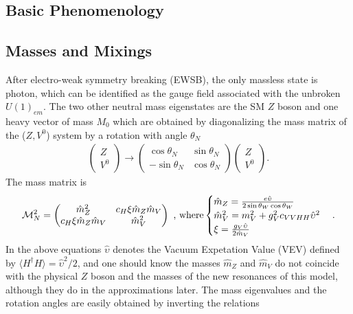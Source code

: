 \subsection{Basic Phenomenology}
\subsection*{Masses and Mixings}
After electro-weak symmetry breaking (EWSB), the only massless state is photon, which can be identified as the gauge field associated with the unbroken $U(1)_{em}$. The two other neutral mass eigenstates are the SM $Z$ boson and one heavy vector of mass $M_{0}$ which are obtained by diagonalizing the mass matrix of the ($Z,V^{0}$) system by a rotation with angle $\theta_{N}$
\begin{align}
  \begin{pmatrix}
    Z\\
    V^{0}
  \end{pmatrix}
  \rightarrow
  \begin{pmatrix}
    \cos{\theta_{N}} & \sin{\theta_{N}}\\
    -\sin{\theta_{N}}& \cos{\theta_{N}}
  \end{pmatrix}
  \begin{pmatrix}
    Z\\
    V^{0}
  \end{pmatrix}
  .
\end{align}
The mass matrix is
\begin{align}
  \label{eq:MassMatrixN}
  \mathcal{M}_{N}^{2}=
  \begin{pmatrix}
    \hat{m}_{Z}^{2} & c_{H}\xi \hat{m}_{Z} \hat{m}_{V}\\
    c_{H}\xi \hat{m}_{Z} \hat{m}_{V} & \hat{m}_{V}^{2}
  \end{pmatrix}
  \textup{ , where}
  \begin{cases}
    \hat{m}_{Z}=\frac{e\hat{\upsilon}}{2\sin{\theta_{W}}\cos{\theta_{W}}}\\
    \hat{m}_{V}^{2}=m_{V}^{2}+g_{V}^{2}c_{VVHH}\hat{\upsilon}^{2}\\
    \xi=\frac{g_{V}\hat{\upsilon}}{2\hat{m}_{V}}
  \end{cases}
  .
\end{align}
In the above equations $\hat{\upsilon}$ denotes the Vacuum Expetation Value (VEV) defined by $\big \langle H^{\dagger}H\big \rangle=\hat{\upsilon}^{2}/2$, and one should know the masses $\hat{m}_{Z}$ and $\hat{m}_{V}$ do not coincide with the physical $Z$ boson and the masses of the new resonances of this model, although they do in the approximations later. The mass eigenvalues and the rotation angles are easily obtained by inverting the relations
